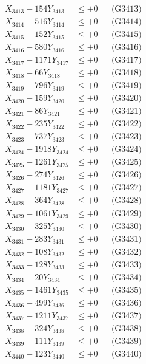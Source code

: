 \documentclass[a4paper,10pt]{article}
\begin{document}
{\begin{align}
X_{3413} - 154Y_{3413} &\leq +0 && \text{(G3413)} \\
X_{3414} - 516Y_{3414} &\leq +0 && \text{(G3414)} \\
X_{3415} - 152Y_{3415} &\leq +0 && \text{(G3415)} \\
X_{3416} - 580Y_{3416} &\leq +0 && \text{(G3416)} \\
X_{3417} - 1171Y_{3417} &\leq +0 && \text{(G3417)} \\
X_{3418} - 66Y_{3418} &\leq +0 && \text{(G3418)} \\
X_{3419} - 796Y_{3419} &\leq +0 && \text{(G3419)} \\
X_{3420} - 159Y_{3420} &\leq +0 && \text{(G3420)} \\
\allowbreak
X_{3421} - 86Y_{3421} &\leq +0 && \text{(G3421)} \\
X_{3422} - 235Y_{3422} &\leq +0 && \text{(G3422)} \\
X_{3423} - 737Y_{3423} &\leq +0 && \text{(G3423)} \\
X_{3424} - 1918Y_{3424} &\leq +0 && \text{(G3424)} \\
X_{3425} - 1261Y_{3425} &\leq +0 && \text{(G3425)} \\
X_{3426} - 274Y_{3426} &\leq +0 && \text{(G3426)} \\
X_{3427} - 1181Y_{3427} &\leq +0 && \text{(G3427)} \\
X_{3428} - 364Y_{3428} &\leq +0 && \text{(G3428)} \\
X_{3429} - 1061Y_{3429} &\leq +0 && \text{(G3429)} \\
X_{3430} - 325Y_{3430} &\leq +0 && \text{(G3430)} \\
\allowbreak
X_{3431} - 283Y_{3431} &\leq +0 && \text{(G3431)} \\
X_{3432} - 108Y_{3432} &\leq +0 && \text{(G3432)} \\
X_{3433} - 128Y_{3433} &\leq +0 && \text{(G3433)} \\
X_{3434} - 20Y_{3434} &\leq +0 && \text{(G3434)} \\
X_{3435} - 1461Y_{3435} &\leq +0 && \text{(G3435)} \\
X_{3436} - 499Y_{3436} &\leq +0 && \text{(G3436)} \\
X_{3437} - 1211Y_{3437} &\leq +0 && \text{(G3437)} \\
X_{3438} - 324Y_{3438} &\leq +0 && \text{(G3438)} \\
X_{3439} - 111Y_{3439} &\leq +0 && \text{(G3439)} \\
X_{3440} - 123Y_{3440} &\leq +0 && \text{(G3440)} \\

\end{align}}
\end{document}
